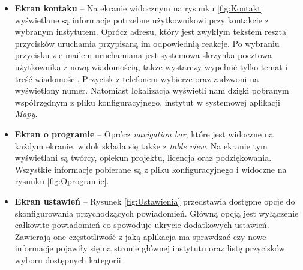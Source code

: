 \documentclass{iiuwb}
\begin{document}
\begin{itemize}
\item \textbf{Ekran kontaku} -- Na ekranie widocznym na rysunku \ref{fig:Kontakt} wyświetlane są informacje potrzebne użytkownikowi przy kontakcie z wybranym instytutem. Oprócz adresu, który jest zwykłym tekstem reszta przycisków uruchamia przypisaną im odpowiednią reakcje. Po wybraniu przycisku z e-mailem uruchamiana jest systemowa skrzynka pocztowa użytkownika z nową wiadomością, także wystarczy wypełnić tylko temat i treść wiadomości. Przycisk z telefonem wybierze oraz zadzwoni na wyświetlony numer. Natomiast lokalizacja wyświetli nam dzięki pobranym współrzędnym z pliku konfiguracyjnego, instytut w systemowej aplikacji \textit{Mapy}. 
\end{itemize}
\newpage

\begin{itemize}

\item \textbf{Ekran o programie} -- Oprócz \textit{navigation bar}, które jest widoczne na każdym ekranie, widok składa się także z \textit{table view}. Na ekranie tym wyświetlani są twórcy, opiekun projektu, licencja oraz podziękowania. Wszystkie informacje pobierane są z pliku konfiguracyjnego i widoczne na rysunku  \ref{fig:Oprogramie}.
\item \textbf{Ekran ustawień} -- Rysunek \ref{fig:Ustawienia} przedstawia dostępne opcje do skonfigurowania przychodzących powiadomień. Główną opcją jest wyłączenie całkowite powiadomień co spowoduje ukrycie dodatkowych ustawień. Zawierają one częstotliwość z jaką aplikacja ma sprawdzać czy nowe informacje pojawiły się na stronie głównej instytutu oraz listę przycisków wyboru dostępnych kategorii.
\end{itemize}
\end{document}
